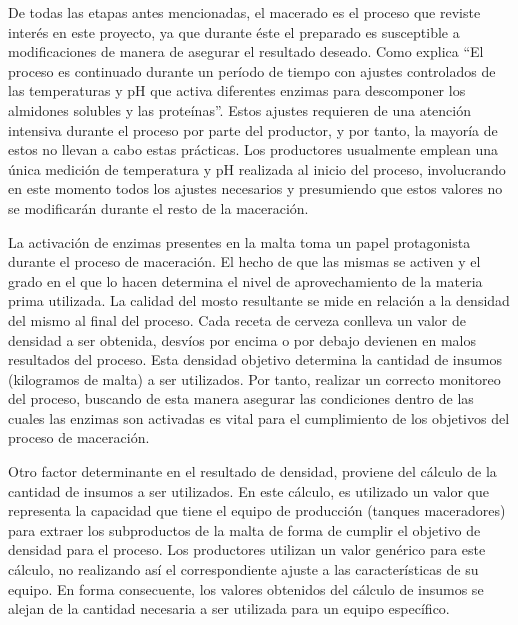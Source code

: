 	\par
	De todas las etapas antes mencionadas, el macerado es el proceso que reviste interés en este proyecto, ya que durante éste el preparado es susceptible a modificaciones de manera de asegurar el resultado deseado. Como explica \cite{Papazian} “El proceso es continuado durante un período de tiempo con ajustes controlados de las temperaturas y pH que activa diferentes enzimas para descomponer los almidones solubles y las proteínas”. Estos ajustes requieren de una atención intensiva durante el proceso por parte del productor, y por tanto, la mayoría de estos no llevan a cabo estas prácticas. Los productores usualmente emplean una única medición de temperatura y pH realizada al inicio del proceso, involucrando en este momento todos los ajustes necesarios y presumiendo que estos valores no se modificarán durante el resto de la maceración.
	\par
	La activación de enzimas presentes en la malta toma un papel protagonista durante el proceso de maceración. El hecho de que las mismas se activen y el grado en el que lo hacen determina el nivel de aprovechamiento de la materia prima utilizada. La calidad del mosto resultante se mide en relación a la densidad del mismo al final del proceso. Cada receta de cerveza conlleva un valor de densidad a ser obtenida, desvíos por encima o por debajo devienen en malos resultados del proceso. Esta densidad objetivo determina la cantidad de insumos (kilogramos de malta) a ser utilizados. Por tanto, realizar un correcto monitoreo del proceso, buscando de esta manera asegurar las condiciones dentro de las cuales las enzimas son activadas es vital para el cumplimiento de los objetivos del proceso de maceración.
	
	\par
	Otro factor determinante en el resultado de densidad, proviene del cálculo de la cantidad de insumos a ser utilizados. En este cálculo, es utilizado un valor que representa la capacidad que tiene el equipo de producción (tanques maceradores) para extraer los subproductos de la malta de forma de cumplir el objetivo de densidad para el proceso. Los productores utilizan un valor genérico para este cálculo, no realizando así el correspondiente ajuste a las características de su equipo. En forma consecuente, los valores obtenidos del cálculo de insumos se alejan de la cantidad necesaria a ser utilizada para un equipo específico.
	
